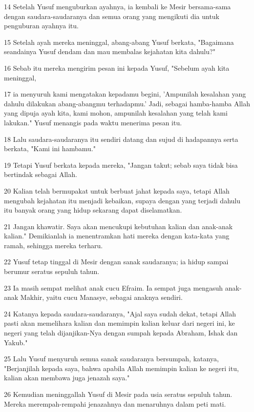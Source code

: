 \par 14 Setelah Yusuf menguburkan ayahnya, ia kembali ke Mesir bersama-sama dengan saudara-saudaranya dan semua orang yang mengikuti dia untuk penguburan ayahnya itu.
\par 15 Setelah ayah mereka meninggal, abang-abang Yusuf berkata, "Bagaimana seandainya Yusuf dendam dan mau membalas kejahatan kita dahulu?"
\par 16 Sebab itu mereka mengirim pesan ini kepada Yusuf, "Sebelum ayah kita meninggal,
\par 17 ia menyuruh kami mengatakan kepadamu begini, 'Ampunilah kesalahan yang dahulu dilakukan abang-abangmu terhadapmu.' Jadi, sebagai hamba-hamba Allah yang dipuja ayah kita, kami mohon, ampunilah kesalahan yang telah kami lakukan." Yusuf menangis pada waktu menerima pesan itu.
\par 18 Lalu saudara-saudaranya itu sendiri datang dan sujud di hadapannya serta berkata, "Kami ini hambamu."
\par 19 Tetapi Yusuf berkata kepada mereka, "Jangan takut; sebab saya tidak bisa bertindak sebagai Allah.
\par 20 Kalian telah bermupakat untuk berbuat jahat kepada saya, tetapi Allah mengubah kejahatan itu menjadi kebaikan, supaya dengan yang terjadi dahulu itu banyak orang yang hidup sekarang dapat diselamatkan.
\par 21 Jangan khawatir. Saya akan mencukupi kebutuhan kalian dan anak-anak kalian." Demikianlah ia menentramkan hati mereka dengan kata-kata yang ramah, sehingga mereka terharu.
\par 22 Yusuf tetap tinggal di Mesir dengan sanak saudaranya; ia hidup sampai berumur seratus sepuluh tahun.
\par 23 Ia masih sempat melihat anak cucu Efraim. Ia sempat juga mengasuh anak-anak Makhir, yaitu cucu Manasye, sebagai anaknya sendiri.
\par 24 Katanya kepada saudara-saudaranya, "Ajal saya sudah dekat, tetapi Allah pasti akan memelihara kalian dan memimpin kalian keluar dari negeri ini, ke negeri yang telah dijanjikan-Nya dengan sumpah kepada Abraham, Ishak dan Yakub."
\par 25 Lalu Yusuf menyuruh semua sanak saudaranya bersumpah, katanya, "Berjanjilah kepada saya, bahwa apabila Allah memimpin kalian ke negeri itu, kalian akan membawa juga jenazah saya."
\par 26 Kemudian meninggallah Yusuf di Mesir pada usia seratus sepuluh tahun. Mereka merempah-rempahi jenazahnya dan menaruhnya dalam peti mati.


